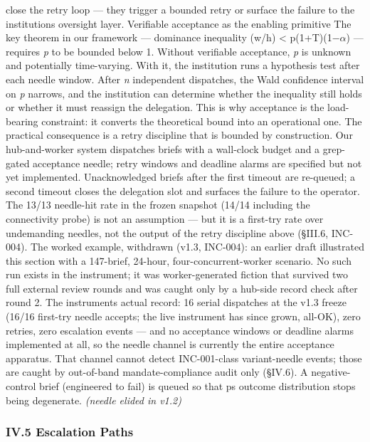 \documentclass[
]{article}
\begin{document}
close the retry loop --- they trigger a bounded retry or surface the
failure to the institution\textquotesingle s oversight layer. Verifiable
acceptance as the enabling primitive The key theorem in our framework
--- dominance inequality (w/h) \textless{} p(1+T)(1$-$$\alpha$) --- requires
\emph{p} to be bounded below 1. Without verifiable acceptance, \emph{p}
is unknown and potentially time-varying. With it, the institution runs a
hypothesis test after each needle window. After \emph{n} independent
dispatches, the Wald confidence interval on \emph{p} narrows, and the
institution can determine whether the inequality still holds or whether
it must reassign the delegation. This is why acceptance is the
load-bearing constraint: it converts the theoretical bound into an
operational one. The practical consequence is a retry discipline that is
bounded by construction. Our hub-and-worker system dispatches briefs
with a wall-clock budget and a grep-gated acceptance needle; retry
windows and deadline alarms are specified but not yet implemented.
Unacknowledged briefs after the first timeout are re-queued; a second
timeout closes the delegation slot and surfaces the failure to the
operator. The 13/13 needle-hit rate in the frozen snapshot (14/14
including the connectivity probe) is not an assumption --- but it is a
first-try rate over undemanding needles, not the output of the retry
discipline above (\S{}III.6, INC-004). The worked example, withdrawn (v1.3,
INC-004): an earlier draft illustrated this section with a 147-brief,
24-hour, four-concurrent-worker scenario. No such run exists in the
instrument; it was worker-generated fiction that survived two full
external review rounds and was caught only by a hub-side record check
after round 2. The instrument\textquotesingle s actual record: 16 serial
dispatches at the v1.3 freeze (16/16 first-try needle accepts; the live
instrument has since grown, all-OK), zero retries, zero escalation
events --- and no acceptance windows or deadline alarms implemented at
all, so the needle channel is currently the entire acceptance apparatus.
That channel cannot detect INC-001-class variant-needle events; those
are caught by out-of-band mandate-compliance audit only (\S{}IV.6). A
negative-control brief (engineered to fail) is queued so that
p\textquotesingle s outcome distribution stops being degenerate.
\emph{(needle elided in v1.2)}

\subsubsection{IV.5 Escalation Paths}\label{iv5-escalation-paths}
\end{document}
